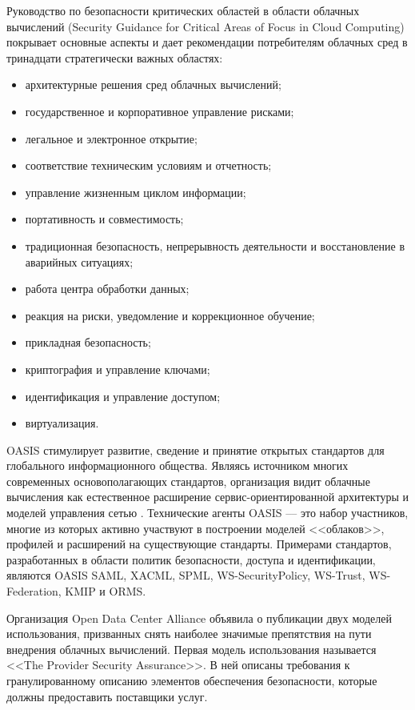 Руководство по безопасности критических областей в области облачных вычислений (Security Guidance for Critical Areas of Focus in Cloud Computing) покрывает основные аспекты и дает рекомендации потребителям облачных сред в тринадцати стратегически важных областях:
\begin{itemize}
  \item архитектурные решения сред облачных вычислений;
  \item государственное и корпоративное управление рисками;
  \item легальное и электронное открытие;
  \item соответствие техническим условиям и отчетность;
  \item управление жизненным циклом информации;
  \item портативность и совместимость;
  \item традиционная безопасность, непрерывность деятельности и восстановление в аварийных ситуациях;
  \item работа центра обработки данных;
  \item реакция на риски, уведомление и коррекционное обучение;
  \item прикладная безопасность;
  \item криптография и управление ключами;
  \item идентификация и управление доступом;
  \item виртуализация.
\end{itemize}

OASIS стимулирует развитие, сведение и принятие открытых стандартов для глобального информационного общества. Являясь источником многих современных основополагающих стандартов, организация видит облачные вычисления как естественное расширение сервис-ориентированной архитектуры и моделей управления сетью \cite{psta}.
Технические агенты OASIS –– это набор участников, многие из которых активно участвуют в построении моделей <<облаков>>, профилей и расширений на существующие стандарты.
Примерами стандартов, разработанных в области политик безопасности, доступа и идентификации, являются OASIS SAML, XACML, SPML, WS-SecurityPolicy, WS-Trust, WS-Federation, KMIP и ORMS.

Организация Open Data Center Alliance объявила о публикации двух моделей использования, призванных снять наиболее значимые препятствия на пути внедрения облачных вычислений.
Первая модель использования называется <<The Provider Security Assurance>>.
В ней описаны требования к гранулированному описанию элементов обеспечения безопасности, которые должны предоставить поставщики услуг.

